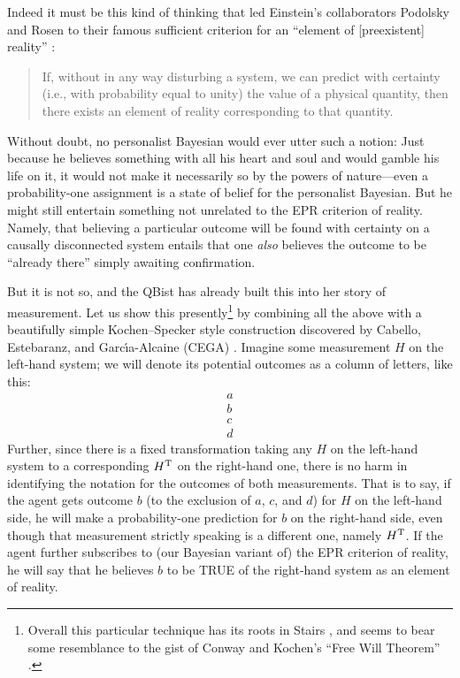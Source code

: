 \documentclass[aps,pra,superscriptaddress,12pt,tightenlines,nofootinbib]{revtex4-2}
\newcommand{\veec}[4]{%
\begin{array}{c}{\!\!#1\!\!}\\{\!\!#2\!\!}\\{\!\!#3\!\!}\\{\!\!#4\!\!}\end{array}}
\begin{document}
Indeed it must be this kind of thinking that led Einstein's collaborators Podolsky and Rosen to their famous sufficient criterion for an ``element of [preexistent] reality'' \cite{Fine96}:
\begin{quote}
\noindent If, without in any way disturbing a system, we can predict with certainty (i.e., with probability equal to unity) the value of a physical quantity, then there exists an element of reality corresponding to that quantity.
\end{quote}
Without doubt, no personalist Bayesian would ever utter such a notion:  Just because he believes something with all his heart and soul and would gamble his life on it, it would not make it necessarily so by the powers of nature---even a probability-one assignment is a state of belief for the personalist Bayesian.  But he might still entertain something not unrelated to the EPR criterion of reality.  Namely, that believing a particular outcome will be found with certainty on a causally disconnected system entails that one {\it also\/} believes the outcome to be ``already there'' simply awaiting confirmation.

But it is not so, and the QBist has already built this into her story of measurement.  Let us show this presently\footnote{Overall this particular technique has its roots in Stairs \cite{Stairs83}, and seems to bear some resemblance to the gist of Conway and Kochen's ``Free Will Theorem'' \cite{Conway06,Conway09}. } by combining all the above with a beautifully simple Kochen--Specker style construction discovered by Cabello, Estebaranz, and Garc\'{\i}a-Alcaine (CEGA) \cite{Cabello97}.  Imagine some measurement $H$ on the left-hand system; we will denote its potential outcomes as a column of letters, like this:
\begin{equation}
\veec abcd
\end{equation}
Further, since there is a fixed transformation taking any $H$ on the left-hand system to a corresponding $H^{\rm T}$ on the right-hand one, there is no harm in identifying the notation for the outcomes of both measurements.  That is to say, if the agent gets outcome $b$ (to the exclusion of $a$, $c$, and $d$) for $H$ on the left-hand side, he will make a probability-one prediction for $b$ on the right-hand side, even though that measurement strictly speaking is a different one, namely $H^{\rm T}$.  If the agent further subscribes to (our Bayesian variant of) the EPR criterion of reality, he will say that he believes $b$ to be TRUE of the right-hand system as an element of reality.
\end{document}
